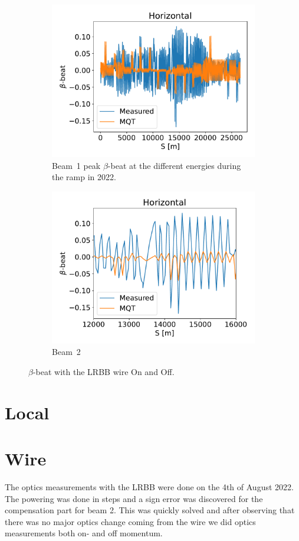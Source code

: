 \documentclass{cernatsnote}
\begin{document}
\begin{figure}[ht]
\begin{subfigure}{.5\textwidth}
  \centering
  \includegraphics[width=.8\linewidth]{ramp/mqt_in_ramp_1900GeV_horizontal.pdf}  
  \caption{Beam~1 peak $\beta$-beat at the different energies during the ramp in 2022.}
\end{subfigure}
\begin{subfigure}{.5\textwidth}
  \centering
  \includegraphics[width=.8\linewidth]{ramp/mqt_in_ramp_1900GeV_horizontal_zoom.pdf}  
  \caption{Beam~2}
\end{subfigure}
\caption{$\beta$-beat with the LRBB wire On and Off.}
\label{fig:ramp_mqt}
\end{figure}

\section{Local}

\section{Wire}
The optics measurements with the LRBB were done on the 4th of August 2022. The powering was done in steps and a sign error was discovered for the compensation part for beam 2. This was quickly solved and after observing that there was no major optics change coming from the wire we did optics measurements both on- and off momentum.
\end{document}
